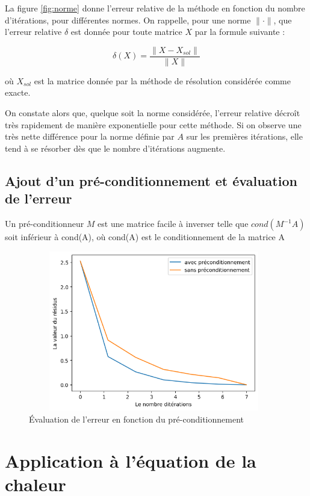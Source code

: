 \documentclass[a4paper]{article}
\begin{document}
La figure \ref{fig:norme} donne l'erreur relative de la méthode en fonction du nombre d'itérations, pour différentes normes. On rappelle, pour une norme $\| \cdot \|$, que l'erreur relative $\delta$ est donnée pour toute matrice $X$ par la formule suivante : 

\begin{equation*}
    \delta(X) = \frac{\|X - X_{sol}\|}{\| X \|}
\end{equation*}

où $X_{sol}$ est la matrice donnée par la méthode de résolution considérée comme exacte.

On constate alors que, quelque soit la norme considérée, l'erreur relative décroît très rapidement de manière exponentielle pour cette méthode. Si on observe une très nette différence pour la norme définie par $A$ sur les premières itérations, elle tend à se résorber dès que le nombre d'itérations augmente.

\subsection{Ajout d'un pré-conditionnement et évaluation de l'erreur}
Un pré-conditionneur $M$ est une matrice facile à inverser telle que $cond(M^{-1}A)$ soit inférieur à cond(A), où cond(A) est le conditionnement de la matrice A

\begin{figure}[!h] 
  \centering
  \includegraphics[width=11cm, height= 7cm]{precond.png}
  \caption{Évaluation de l'erreur en fonction du pré-conditionnement}
  \label{fig:precond}
\end{figure}


\section{Application à l'équation de la chaleur}
\end{document}
